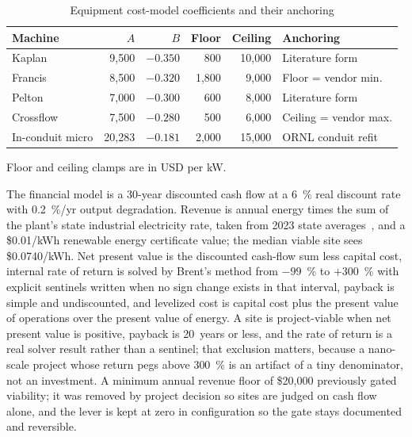 \documentclass[12pt,letterpaper]{report}
\begin{document}
\begin{table}[htbp]
\centering
\caption{Equipment cost-model coefficients and their anchoring}
\label{tab:cost_params}
\small
\begin{tabular}{@{}lrrrrl@{}}
\toprule
Machine & $A$ & $B$ & Floor & Ceiling & Anchoring \\
\midrule
Kaplan           & 9{,}500  & $-0.350$ & 800     & 10{,}000 & Literature form \\
Francis          & 8{,}500  & $-0.320$ & 1{,}800 & 9{,}000  & Floor = vendor min. \\
Pelton           & 7{,}000  & $-0.300$ & 600     & 8{,}000  & Literature form \\
Crossflow        & 7{,}500  & $-0.280$ & 500     & 6{,}000  & Ceiling = vendor max. \\
In-conduit micro & 20{,}283 & $-0.181$ & 2{,}000 & 15{,}000 & ORNL conduit refit \\
\bottomrule
\end{tabular}

\vspace{0.4em}
{\footnotesize Floor and ceiling clamps are in USD per kW.}
\end{table}

The financial model is a 30-year discounted cash flow at a 6~\% real discount
rate with 0.2~\%/yr output degradation. Revenue is annual energy times the sum of
the plant's state industrial electricity rate, taken from 2023 state
averages~\cite{eia_rates}, and a \$0.01/kWh renewable energy certificate value;
the median viable site sees \$0.0740/kWh. Net present value is the discounted
cash-flow sum less capital cost, internal rate of return is solved by Brent's
method from $-99$~\% to $+300$~\% with explicit sentinels written when no sign
change exists in that interval, payback is simple and undiscounted, and levelized
cost is capital cost plus the present value of operations over the present value
of energy. A site is project-viable when net present value is positive, payback is
20~years or less, and the rate of return is a real solver result rather than a
sentinel; that exclusion matters, because a nano-scale project whose return
pegs above 300~\% is an artifact of a tiny denominator, not an investment. A
minimum annual revenue floor of \$20{,}000 previously gated viability; it was
removed by project decision so sites are judged on cash flow alone, and the lever
is kept at zero in configuration so the gate stays documented and reversible.
\end{document}
